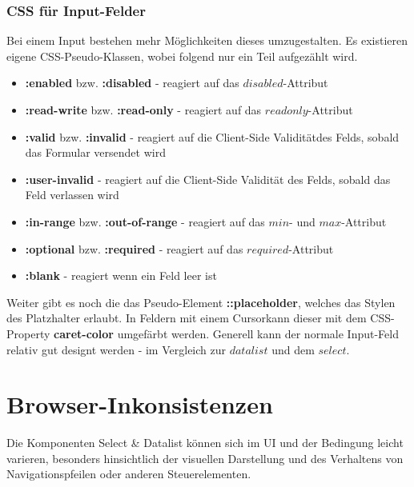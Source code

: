 \subsubsection{CSS für Input-Felder}
Bei einem Input bestehen mehr Möglichkeiten dieses umzugestalten.
Es existieren eigene CSS-Pseudo-Klassen, wobei folgend nur ein Teil aufgezählt wird.

\begin{itemize}
    \item \textbf{:enabled} bzw. \textbf{:disabled} - reagiert auf das $disabled$-Attribut
    \item \textbf{:read-write} bzw. \textbf{:read-only} - reagiert auf das $readonly$-Attribut
    \item \textbf{:valid} bzw. \textbf{:invalid} - reagiert auf die Client-Side Validität\footnotemark des Felds, sobald das Formular versendet wird
    \item \textbf{:user-invalid} - reagiert auf die Client-Side Validität des Felds, sobald das Feld verlassen wird
    \item \textbf{:in-range} bzw. \textbf{:out-of-range} - reagiert auf das $min$- und $max$-Attribut
    \item \textbf{:optional} bzw. \textbf{:required} - reagiert auf das $required$-Attribut
    \item \textbf{:blank} - reagiert wenn ein Feld leer ist
\end{itemize}

Weiter gibt es noch die das Pseudo-Element \textbf{::placeholder}, welches das Stylen des Platzhalter erlaubt.
In Feldern mit einem Cursor\footnotemark kann dieser mit dem CSS-Property \textbf{caret-color} umgefärbt werden.
Generell kann der normale Input-Feld relativ gut designt werden - im Vergleich zur $datalist$ und dem $select$.


\section{Browser-Inkonsistenzen}
Die Komponenten Select \& Datalist können sich im UI und der Bedingung leicht varieren,
besonders hinsichtlich der visuellen Darstellung und des Verhaltens von Navigationspfeilen oder anderen Steuerelementen.


